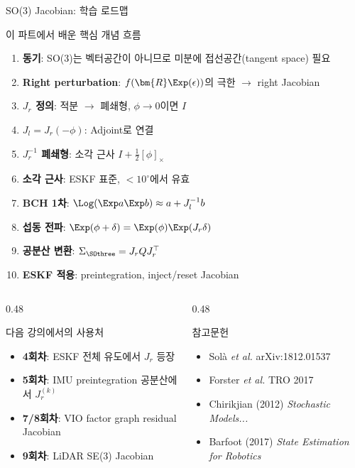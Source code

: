 \begin{frame}[shrink=5]{SO(3) Jacobian: 학습 로드맵}
  \begin{block}{이 파트에서 배운 핵심 개념 흐름}
    \footnotesize
    \begin{enumerate}
      \item \textbf{동기}: SO(3)는 벡터공간이 아니므로 미분에 접선공간(tangent space) 필요
      \item \textbf{Right perturbation}: $f(\bm{R}\Exp(\epsilon))$의 극한 $\rightarrow$ right Jacobian
      \item \textbf{$J_r$ 정의}: 적분 $\rightarrow$ 폐쇄형, $\phi\to 0$이면 $I$
      \item \textbf{$J_l = J_r(-\phi)$}: Adjoint로 연결
      \item \textbf{$J_r^{-1}$ 폐쇄형}: 소각 근사 $I + \tfrac{1}{2}[\phi]_\times$
      \item \textbf{소각 근사}: ESKF 표준, $<10^\circ$에서 유효
      \item \textbf{BCH 1차}: $\Log(\Exp a\Exp b) \approx a + J_l^{-1}b$
      \item \textbf{섭동 전파}: $\Exp(\phi+\delta) = \Exp(\phi)\Exp(J_r\delta)$
      \item \textbf{공분산 변환}: $\Sigma_{\SOthree} = J_r Q J_r^\top$
      \item \textbf{ESKF 적용}: preintegration, inject/reset Jacobian
    \end{enumerate}
  \end{block}
  \pause
  \begin{columns}[T]
    \begin{column}{0.48\textwidth}
      \begin{block}{다음 강의에서의 사용처}
        \begin{itemize}
          \item \textbf{4회차}: ESKF 전체 유도에서 $J_r$ 등장
          \item \textbf{5회차}: IMU preintegration 공분산에서 $J_r^{(k)}$
          \item \textbf{7/8회차}: VIO factor graph residual Jacobian
          \item \textbf{9회차}: LiDAR SE(3) Jacobian
        \end{itemize}
      \end{block}
    \end{column}
    \begin{column}{0.48\textwidth}
      \begin{exampleblock}{참고문헌}
        \begin{itemize}
          \item Solà \textit{et al.} arXiv:1812.01537
          \item Forster \textit{et al.} TRO 2017
          \item Chirikjian (2012) \textit{Stochastic Models...}
          \item Barfoot (2017) \textit{State Estimation for Robotics}
        \end{itemize}
      \end{exampleblock}
    \end{column}
  \end{columns}
\end{frame}
